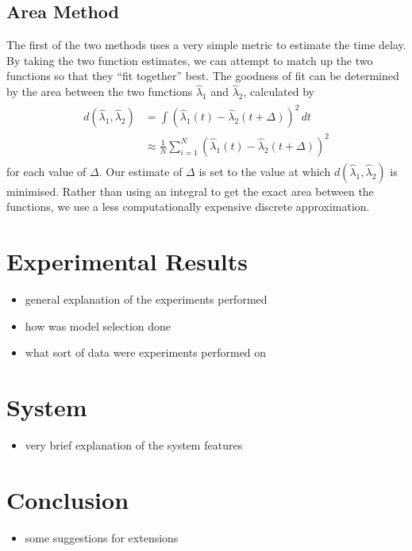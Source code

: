 \documentclass[a4paper,11pt]{article}
\begin{document}
\subsection{Area Method}
\label{sec-5-2}

   The first of the two methods uses a very simple metric to estimate the time
   delay. By taking the two function estimates, we can attempt to match up the
   two functions so that they ``fit together'' best. The goodness of fit can be
   determined by the area between the two functions $\hat{\lambda}_1$ and
   $\hat{\lambda}_2$, calculated by
   \begin{align}
   \begin{split}
   d(\hat{\lambda}_1,\hat{\lambda}_2)&=\int(\hat{\lambda}_1(t)-\hat{\lambda}_2(t+\Delta))^2\,dt\\
   &\approx\frac{1}{N}\sum_{i=1}^N(\hat{\lambda}_1(t)-\hat{\lambda}_2(t+\Delta))^2
   \end{split}
   \end{align}
   for each value of $\Delta$. Our estimate of $\Delta$ is set to the value at
   which $d(\hat{\lambda}_1,\hat{\lambda}_2)$ is minimised. Rather than using an
   integral to get the exact area between the functions, we use a less
   computationally expensive discrete approximation.
\section{Experimental Results}
\label{sec-6}

\begin{itemize}
\item general explanation of the experiments performed
\item how was model selection done
\item what sort of data were experiments performed on
\end{itemize}
\section{System}
\label{sec-7}

\begin{itemize}
\item very brief explanation of the system features
\end{itemize}
\section{Conclusion}
\label{sec-8}

\begin{itemize}
\item some suggestions for extensions
\end{itemize}
\end{document}
